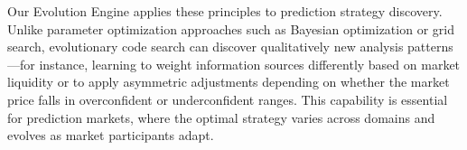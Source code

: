 Our Evolution Engine applies these principles to prediction strategy discovery. Unlike parameter optimization approaches such as Bayesian optimization or grid search, evolutionary code search can discover qualitatively new analysis patterns---for instance, learning to weight information sources differently based on market liquidity or to apply asymmetric adjustments depending on whether the market price falls in overconfident or underconfident ranges. This capability is essential for prediction markets, where the optimal strategy varies across domains and evolves as market participants adapt.
